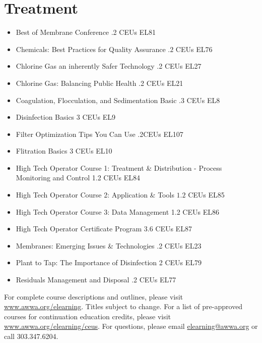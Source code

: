 \documentclass[10pt]{article}
\begin{document}
\section{Treatment}
\begin{itemize}
  \item Best of Membrane Conference .2 CEUs EL81

  \item Chemicals: Best Practices for Quality Assurance $.2$ CEUs EL76

  \item Chlorine Gas an inherently Safer Technology .2 CEUs EL27

  \item Chlorine Gas: Balancing Public Health .2 CEUs EL21

  \item Coagulation, Flocculation, and Sedimentation Basic .3 CEUs EL8

  \item Disinfection Basics 3 CEUs EL9

  \item Filter Optimization Tips You Can Use .2CEUs EL107

  \item Flitration Basics 3 CEUs EL10

  \item High Tech Operator Course 1: Treatment \& Distribution - Process Monitoring and Control 1.2 CEUs EL84

  \item High Tech Operator Course 2: Application \& Tools $1.2$ CEUs EL85

  \item High Tech Operator Course 3: Data Management 1.2 CEUs EL86

  \item High Tech Operator Certificate Program 3.6 CEUs EL87

  \item Membranes: Emerging Issues \& Technologies .2 CEUs EL23

  \item Plant to Tap: The Importance of Disinfection 2 CEUs EL79

  \item Residuals Management and Disposal .2 CEUs EL77

\end{itemize}

For complete course descriptions and outlines, please visit \href{http://www.awwa.org/elearning}{www.awwa.org/elearning}. Titles subject to change. For a list of pre-approved courses for continuation education credits, please visit \href{http://www.awwa.org/elearning/ceus}{www.awwa.org/elearning/ceus}. For questions, please email \href{mailto:elearning@awwa.org}{elearning@awwa.org} or call 303.347.6204.
\end{document}
